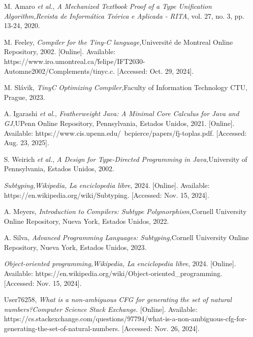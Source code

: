 \begin{thebibliography}{11}
    \label{sec:125}
    \hypertarget{125}{}
    M. Amaro \textit{et al.}, \textit{A Mechanized Textbook Proof of a Type Unification Algorithm,}\textit{Revista de Informática Teórica e Aplicada - RITA}, vol. 27, no. 3, pp. 13-24, 2020.

    \label{sec:126}
    \hypertarget{126}{}
    M. Feeley, \textit{Compiler for the Tiny-C language,}Université de Montreal Online Repository, 2002. [Online]. Available: https://www.iro.umontreal.ca/\~felipe/IFT2030-Automne2002/Complements/tinyc.c. [Accessed: Oct. 29, 2024].

    \label{sec:127}
    \hypertarget{127}{}
    M. Slávik, \textit{TinyC Optimizing Compiler,}Faculty of Information Technology CTU, Prague, 2023.

    \label{sec:128}
    \hypertarget{128}{}
    A. Igarashi \textit{et al.}, \textit{Featherweight Java: A Minimal Core Calculus for Java and GJ,}UPenn Online Repository, Pennsylvania, Estados Unidos, 2021. [Online]. Available: https://www.cis.upenn.edu/~bcpierce/papers/fj-toplas.pdf. [Accessed: Aug. 23, 2025].

    \label{sec:129}
    \hypertarget{129}{}
    S. Weirich \textit{et al.}, \textit{A Design for Type-Directed Programming in Java,}University of Pennsylvania, Estados Unidos, 2002.

    \label{sec:130}
    \hypertarget{130}{}
    \textit{Subtyping,}\textit{Wikipedia, La enciclopedia libre}, 2024. [Online]. Available: https://en.wikipedia.org/wiki/Subtyping. [Accessed: Nov. 15, 2024].

    \label{sec:131}
    \hypertarget{131}{}
    A. Meyers, \textit{Introduction to Compilers: Subtype Polymorphism,}Cornell University Online Repository, Nueva York, Estados Unidos, 2022.

    \label{sec:132}
    \hypertarget{132}{}
    A. Silva, \textit{Advanced Programming Languages: Subtyping,}Cornell University Online Repository, Nueva York, Estados Unidos, 2023.

    \label{sec:133}
    \hypertarget{133}{}
    \textit{Object-oriented programming,}\textit{Wikipedia, La enciclopedia libre}, 2024. [Online]. Available: https://en.wikipedia.org/wiki/Object-oriented\_programming. [Accessed: Nov. 15, 2024].

    \label{sec:134}
    \hypertarget{134}{}
    User76258, \textit{What is a non-ambiguous CFG for generating the set of natural numbers?}\textit{Computer Science Stack Exchange}. [Online]. Available: https://cs.stackexchange.com/questions/97794/what-is-a-non-ambiguous-cfg-for-generating-the-set-of-natural-numbers. [Accessed: Nov. 26, 2024].


\end{thebibliography}
